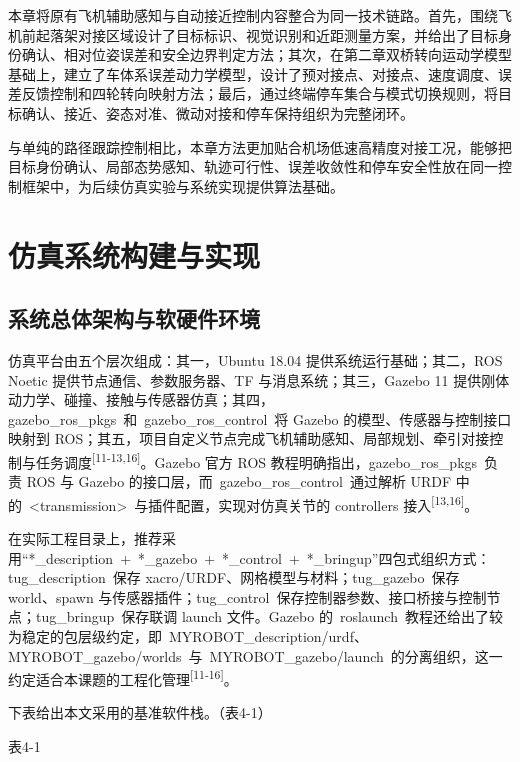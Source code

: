 \documentclass[UTF8,a4paper,12pt]{ctexart}
\begin{document}
本章将原有飞机辅助感知与自动接近控制内容整合为同一技术链路。首先，围绕飞机前起落架对接区域设计了目标标识、视觉识别和近距测量方案，并给出了目标身份确认、相对位姿误差和安全边界判定方法；其次，在第二章双桥转向运动学模型基础上，建立了车体系误差动力学模型，设计了预对接点、对接点、速度调度、误差反馈控制和四轮转向映射方法；最后，通过终端停车集合与模式切换规则，将目标确认、接近、姿态对准、微动对接和停车保持组织为完整闭环。

与单纯的路径跟踪控制相比，本章方法更加贴合机场低速高精度对接工况，能够把目标身份确认、局部态势感知、轨迹可行性、误差收敛性和停车安全性放在同一控制框架中，为后续仿真实验与系统实现提供算法基础。

\section{仿真系统构建与实现}\label{_Toc228997220}

\subsection{系统总体架构与软硬件环境}\label{_Toc228997221}

仿真平台由五个层次组成：其一，Ubuntu 18.04 提供系统运行基础；其二，ROS Noetic 提供节点通信、参数服务器、TF 与消息系统；其三，Gazebo 11 提供刚体动力学、碰撞、接触与传感器仿真；其四，gazebo\_ros\_pkgs~和~gazebo\_ros\_control~将 Gazebo 的模型、传感器与控制接口映射到 ROS；其五，项目自定义节点完成飞机辅助感知、局部规划、牵引对接控制与任务调度\textsuperscript{[11-13,16]}。Gazebo 官方 ROS 教程明确指出，gazebo\_ros\_pkgs~负责 ROS 与 Gazebo 的接口层，而~gazebo\_ros\_control~通过解析 URDF 中的~\textless transmission\textgreater~与插件配置，实现对仿真关节的 controllers 接入\textsuperscript{[13,16]}。

在实际工程目录上，推荐采用``*\_description~+~*\_gazebo~+~*\_control~+~*\_bringup''四包式组织方式：tug\_description~保存 xacro/URDF、网格模型与材料；tug\_gazebo~保存 world、spawn 与传感器插件；tug\_control~保存控制器参数、接口桥接与控制节点；tug\_bringup~保存联调 launch 文件。Gazebo 的~roslaunch~教程还给出了较为稳定的包层级约定，即~MYROBOT\_description/urdf、MYROBOT\_gazebo/worlds~与~MYROBOT\_gazebo/launch~的分离组织，这一约定适合本课题的工程化管理\textsuperscript{[11-16]}。

下表给出本文采用的基准软件栈。（表4-1）

表4-1
\end{document}
